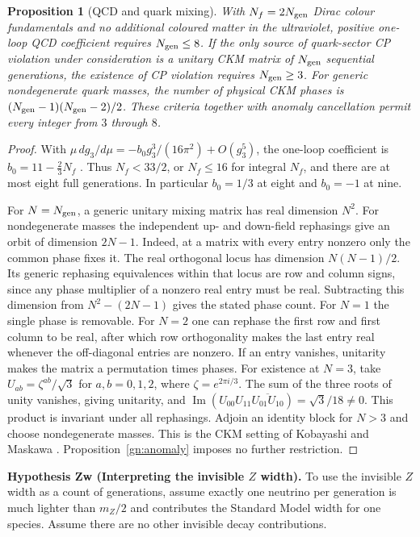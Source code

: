 \documentclass[aps,pra,onecolumn,superscriptaddress,nofootinbib,10pt]{revtex4-2}
\newtheorem{proposition}[theorem]{Proposition}
\theoremstyle{definition}
\theoremstyle{remark}
\begin{document}
\begin{proposition}[QCD and quark mixing]\label{gn:bounds}
With $N_f=2N_{\rm gen}$ Dirac colour fundamentals and no additional
coloured matter in the ultraviolet, positive one-loop QCD coefficient
requires $N_{\rm gen}\leq8$. If the only source of quark-sector CP
violation under consideration is a unitary CKM matrix of
$N_{\rm gen}$ sequential generations, the existence of CP violation
requires $N_{\rm gen}\geq3$. For generic nondegenerate quark masses,
the number of physical CKM phases is
$(N_{\rm gen}-1)(N_{\rm gen}-2)/2$.
These criteria together with anomaly cancellation permit every
integer from $3$ through $8$.
\end{proposition}
\begin{proof}
With $\mu\,dg_3/d\mu=-b_0g_3^3/(16\pi^2)+O(g_3^5)$, the one-loop
coefficient is $b_0=11-\frac23N_f$ \cite{gn:gw,gn:politzer}.
Thus $N_f<33/2$, or $N_f\le16$ for integral $N_f$, and there are
at most eight full generations. In particular $b_0=1/3$ at eight
and $b_0=-1$ at nine.

For $N=N_{\rm gen}$, a generic unitary mixing matrix has real
dimension $N^2$. For nondegenerate masses the independent up- and
down-field rephasings give an orbit of dimension $2N-1$.
Indeed, at a matrix with every entry nonzero only the common
phase fixes it. The real orthogonal locus has dimension
$N(N-1)/2$. Its generic rephasing equivalences within that
locus are row and column signs, since any phase multiplier of a
nonzero real entry must be real. Subtracting this dimension from
$N^2-(2N-1)$ gives the stated phase count. For $N=1$ the single phase
is removable. For $N=2$ one can rephase the first row and first
column to be real, after which row orthogonality makes the last
entry real whenever the off-diagonal entries are nonzero. If
an entry vanishes, unitarity makes the matrix a permutation
times phases. For existence at $N=3$, take
$U_{ab}=\zeta^{ab}/\sqrt3$ for $a,b=0,1,2$,
where $\zeta=e^{2\pi i/3}$. The sum of the three roots of unity
vanishes, giving unitarity, and
$\operatorname{Im}(U_{00}U_{11}\overline{U_{01}U_{10}})
=\sqrt3/18\ne0$. This product is invariant under all rephasings.
Adjoin an identity block for $N>3$ and choose nondegenerate masses.
This is the CKM setting of Kobayashi and Maskawa \cite{gn:km}.
Proposition~\ref{gn:anomaly} imposes no further restriction.
\end{proof}

\smallskip\noindent\textbf{Hypothesis Zw (Interpreting the invisible $Z$ width).}\label{hyp:Zw}  To use the invisible $Z$ width as a count of generations, assume
exactly one neutrino per generation is much lighter than $m_Z/2$
and contributes the Standard Model width for one species. Assume
there are no other invisible decay contributions.
\end{document}
